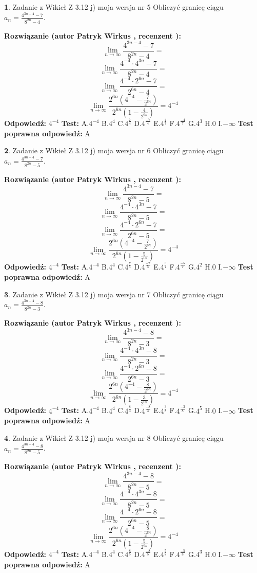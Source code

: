 \documentclass[12pt, a4paper]{article}
\theoremstyle{definition} %
\newtheorem{zad}{}
\newcommand{\zadStart}[1]{\begin{zad}#1\newline}
\newcommand{\zadStop}{\end{zad}}
\newcommand{\rozwStart}[2]{\noindent \textbf{Rozwiązanie (autor #1 , recenzent #2): }\newline}
\newcommand{\rozwStop}{\newline}
\newcommand{\odpStart}{\noindent \textbf{Odpowiedź:}\newline}
\newcommand{\odpStop}{\newline}
\newcommand{\testStart}{\noindent \textbf{Test:}\newline}
\newcommand{\testStop}{\newline}
\newcommand{\kluczStart}{\noindent \textbf{Test poprawna odpowiedź:}\newline}
\newcommand{\kluczStop}{\newline}
\begin{document}
\zadStart{Zadanie z Wikieł Z 3.12 j) moja wersja nr 5}
Obliczyć granicę ciągu $a_{n}=\frac{4^{3n-4}-7}{8^{2n}-4}$.
\zadStop
\rozwStart{Patryk Wirkus}{}
$$\lim\limits_{n\to\infty}\frac{4^{3n-4}-7}{8^{2n}-4}=$$
$$\lim\limits_{n\to\infty}\frac{4^{-4} \cdot 4^{3n}-7}{8^{2n}-4}=$$
$$\lim\limits_{n\to\infty}\frac{4^{-4} \cdot 2^{6n}-7}{2^{6n}-4}=$$
$$\lim\limits_{n\to\infty}\frac{2^{6n}(4^{-4} - \frac{7}{2^{6n}})}{2^{6n}(1-\frac{4}{2^{6n}})}= 4^{-4}$$
\rozwStop
\odpStart
$4^{-4}$
\odpStop
\testStart
A.$4^{-4}$
B.$4^{4}$
C.$4^{\frac{7}{4}}$
D.$4^{\frac{-7}{4}}$
E.$4^{\frac{4}{7}}$
F.$4^{\frac{-4}{7}}$
G.$4^{3}$
H.$0$
I.$-\infty$
\testStop
\kluczStart
A
\kluczStop



\zadStart{Zadanie z Wikieł Z 3.12 j) moja wersja nr 6}
Obliczyć granicę ciągu $a_{n}=\frac{4^{3n-4}-7}{8^{2n}-5}$.
\zadStop
\rozwStart{Patryk Wirkus}{}
$$\lim\limits_{n\to\infty}\frac{4^{3n-4}-7}{8^{2n}-5}=$$
$$\lim\limits_{n\to\infty}\frac{4^{-4} \cdot 4^{3n}-7}{8^{2n}-5}=$$
$$\lim\limits_{n\to\infty}\frac{4^{-4} \cdot 2^{6n}-7}{2^{6n}-5}=$$
$$\lim\limits_{n\to\infty}\frac{2^{6n}(4^{-4} - \frac{7}{2^{6n}})}{2^{6n}(1-\frac{5}{2^{6n}})}= 4^{-4}$$
\rozwStop
\odpStart
$4^{-4}$
\odpStop
\testStart
A.$4^{-4}$
B.$4^{4}$
C.$4^{\frac{7}{5}}$
D.$4^{\frac{-7}{5}}$
E.$4^{\frac{5}{7}}$
F.$4^{\frac{-5}{7}}$
G.$4^{2}$
H.$0$
I.$-\infty$
\testStop
\kluczStart
A
\kluczStop



\zadStart{Zadanie z Wikieł Z 3.12 j) moja wersja nr 7}
Obliczyć granicę ciągu $a_{n}=\frac{4^{3n-4}-8}{8^{2n}-3}$.
\zadStop
\rozwStart{Patryk Wirkus}{}
$$\lim\limits_{n\to\infty}\frac{4^{3n-4}-8}{8^{2n}-3}=$$
$$\lim\limits_{n\to\infty}\frac{4^{-4} \cdot 4^{3n}-8}{8^{2n}-3}=$$
$$\lim\limits_{n\to\infty}\frac{4^{-4} \cdot 2^{6n}-8}{2^{6n}-3}=$$
$$\lim\limits_{n\to\infty}\frac{2^{6n}(4^{-4} - \frac{8}{2^{6n}})}{2^{6n}(1-\frac{3}{2^{6n}})}= 4^{-4}$$
\rozwStop
\odpStart
$4^{-4}$
\odpStop
\testStart
A.$4^{-4}$
B.$4^{4}$
C.$4^{\frac{8}{3}}$
D.$4^{\frac{-8}{3}}$
E.$4^{\frac{3}{8}}$
F.$4^{\frac{-3}{8}}$
G.$4^{5}$
H.$0$
I.$-\infty$
\testStop
\kluczStart
A
\kluczStop



\zadStart{Zadanie z Wikieł Z 3.12 j) moja wersja nr 8}
Obliczyć granicę ciągu $a_{n}=\frac{4^{3n-4}-8}{8^{2n}-5}$.
\zadStop
\rozwStart{Patryk Wirkus}{}
$$\lim\limits_{n\to\infty}\frac{4^{3n-4}-8}{8^{2n}-5}=$$
$$\lim\limits_{n\to\infty}\frac{4^{-4} \cdot 4^{3n}-8}{8^{2n}-5}=$$
$$\lim\limits_{n\to\infty}\frac{4^{-4} \cdot 2^{6n}-8}{2^{6n}-5}=$$
$$\lim\limits_{n\to\infty}\frac{2^{6n}(4^{-4} - \frac{8}{2^{6n}})}{2^{6n}(1-\frac{5}{2^{6n}})}= 4^{-4}$$
\rozwStop
\odpStart
$4^{-4}$
\odpStop
\testStart
A.$4^{-4}$
B.$4^{4}$
C.$4^{\frac{8}{5}}$
D.$4^{\frac{-8}{5}}$
E.$4^{\frac{5}{8}}$
F.$4^{\frac{-5}{8}}$
G.$4^{3}$
H.$0$
I.$-\infty$
\testStop
\kluczStart
A
\kluczStop
\end{document}
